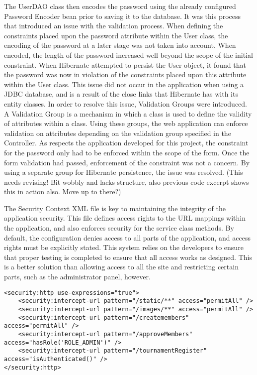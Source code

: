 The UserDAO class then encodes the password using the already configured Password Encoder bean prior to saving it to the database. It was this process that introduced an issue with the validation process. When defining the constraints placed upon the password attribute within the User class, the encoding of the password at a later stage was not taken into account. When encoded, the length of the password increased well beyond the scope of the initial constraint. When Hibernate attempted to persist the User object, it found that the password was now in violation of the constraints placed upon this attribute within the User class. This issue did not occur in the application when using a JDBC database, and is a result of the close links that Hibernate has with its entity classes. In order to resolve this issue, Validation Groups were introduced. A Validation Group is a mechanism in which a class is used to define the validity of attributes within a class. Using these groups, the web application can enforce validation on attributes depending on the validation group specified in the Controller. As respects the application developed for this project, the constraint for the password only had to be enforced within the scope of the form. Once the form validation had passed, enforcement of the constraint was not a concern. By using a separate group for Hibernate persistence, the issue was resolved. (This needs revising! Bit wobbly and lacks structure, also previous code excerpt shows this in action also. Move up to there?)

The Security Context XML file is key to maintaining the integrity of the application security. This file defines access rights to the URL mappings within the application, and also enforces security for the service class methods. By default, the configuration denies access to all parts of the application, and access rights must be explicitly stated. This system relies on the developers to ensure that proper testing is completed to ensure that all access works as designed. This is a better solution than allowing access to all the site and restricting certain parts, such as the administrator panel, however. \newline

\begin{lstlisting}
<security:http use-expressions="true">
	<security:intercept-url pattern="/static/**" access="permitAll" />
	<security:intercept-url pattern="/images/**" access="permitAll" />
	<security:intercept-url pattern="/createmembers" access="permitAll" />
	<security:intercept-url pattern="/approveMembers" access="hasRole('ROLE_ADMIN')" />
	<security:intercept-url pattern="/tournamentRegister" access="isAuthenticated()" />
</security:http>
\end{lstlisting}

